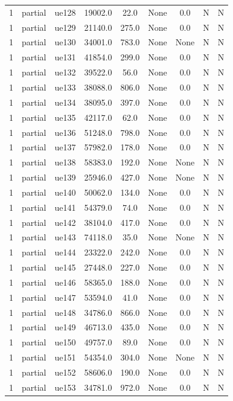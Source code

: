 \begin{table}[ht]
\begin{tabular}{|c|c|c|c|c|c|c|c|c|}
1 & partial & ue128 & 19002.0 & 22.0 & None & 0.0 & N & N \\
1 & partial & ue129 & 21140.0 & 275.0 & None & 0.0 & N & N \\
1 & partial & ue130 & 34001.0 & 783.0 & None & None & N & N \\
1 & partial & ue131 & 41854.0 & 299.0 & None & 0.0 & N & N \\
1 & partial & ue132 & 39522.0 & 56.0 & None & 0.0 & N & N \\
1 & partial & ue133 & 38088.0 & 806.0 & None & 0.0 & N & N \\
1 & partial & ue134 & 38095.0 & 397.0 & None & 0.0 & N & N \\
1 & partial & ue135 & 42117.0 & 62.0 & None & 0.0 & N & N \\
1 & partial & ue136 & 51248.0 & 798.0 & None & 0.0 & N & N \\
1 & partial & ue137 & 57982.0 & 178.0 & None & 0.0 & N & N \\
1 & partial & ue138 & 58383.0 & 192.0 & None & None & N & N \\
1 & partial & ue139 & 25946.0 & 427.0 & None & None & N & N \\
1 & partial & ue140 & 50062.0 & 134.0 & None & 0.0 & N & N \\
1 & partial & ue141 & 54379.0 & 74.0 & None & 0.0 & N & N \\
1 & partial & ue142 & 38104.0 & 417.0 & None & 0.0 & N & N \\
1 & partial & ue143 & 74118.0 & 35.0 & None & None & N & N \\
1 & partial & ue144 & 23322.0 & 242.0 & None & 0.0 & N & N \\
1 & partial & ue145 & 27448.0 & 227.0 & None & 0.0 & N & N \\
1 & partial & ue146 & 58365.0 & 188.0 & None & 0.0 & N & N \\
1 & partial & ue147 & 53594.0 & 41.0 & None & 0.0 & N & N \\
1 & partial & ue148 & 34786.0 & 866.0 & None & 0.0 & N & N \\
1 & partial & ue149 & 46713.0 & 435.0 & None & 0.0 & N & N \\
1 & partial & ue150 & 49757.0 & 89.0 & None & 0.0 & N & N \\
1 & partial & ue151 & 54354.0 & 304.0 & None & None & N & N \\
1 & partial & ue152 & 58606.0 & 190.0 & None & 0.0 & N & N \\
1 & partial & ue153 & 34781.0 & 972.0 & None & 0.0 & N & N \\

\end{tabular}
\end{table}
